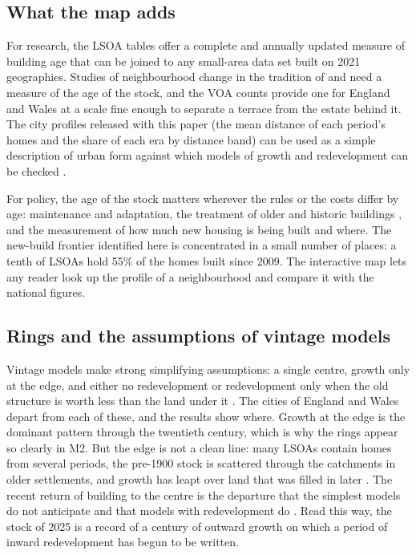 \documentclass[11pt,a4paper]{article}
\begin{document}
\subsection{What the map adds}
For research, the LSOA tables offer a complete and annually updated measure of building age that can be joined to any small-area data set built on 2021 geographies. Studies of neighbourhood change in the tradition of \citet{rosenthal2008} and \citet{brueckner2009} need a measure of the age of the stock, and the VOA counts provide one for England and Wales at a scale fine enough to separate a terrace from the estate behind it. The city profiles released with this paper (the mean distance of each period's homes and the share of each era by distance band) can be used as a simple description of urban form against which models of growth and redevelopment can be checked \citep{harrison1974,wheaton1982,hanlon2022}.

For policy, the age of the stock matters wherever the rules or the costs differ by age: maintenance and adaptation, the treatment of older and historic buildings \citep{waights2019}, and the measurement of how much new housing is being built and where. The new-build frontier identified here is concentrated in a small number of places: a tenth of LSOAs hold 55\% of the homes built since 2009. The interactive map lets any reader look up the profile of a neighbourhood and compare it with the national figures.

\subsection{Rings and the assumptions of vintage models}
Vintage models make strong simplifying assumptions: a single centre, growth only at the edge, and either no redevelopment or redevelopment only when the old structure is worth less than the land under it \citep{brueckner1980,wheaton1982}. The cities of England and Wales depart from each of these, and the results show where. Growth at the edge is the dominant pattern through the twentieth century, which is why the rings appear so clearly in M2. But the edge is not a clean line: many LSOAs contain homes from several periods, the pre-1900 stock is scattered through the catchments in older settlements, and growth has leapt over land that was filled in later \citep{rodriguez1986}. The recent return of building to the centre is the departure that the simplest models do not anticipate and that models with redevelopment do \citep{braid2001}. Read this way, the stock of 2025 is a record of a century of outward growth on which a period of inward redevelopment has begun to be written.
\end{document}
